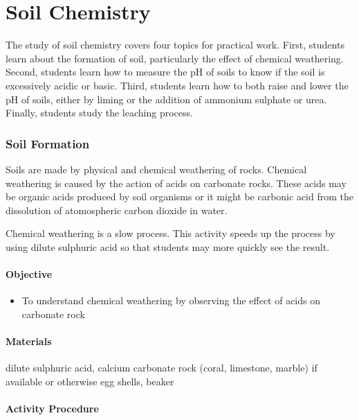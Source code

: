 \chapter{Soil Chemistry}

The study of soil chemistry covers four topics for practical work. First, students learn about the formation of soil, particularly the effect of chemical weathering. Second, students learn how to measure the pH of soils to know if the soil is excessively acidic or basic. Third, students learn how to both raise and lower the pH of soils, either by liming or the addition of ammonium sulphate or urea. Finally, students study the leaching process.

\subsection{Soil Formation}

Soils are made by physical and chemical weathering of rocks. Chemical weathering is caused by the action of acids on carbonate rocks. These acids may be organic acids produced by soil organisms or it might be carbonic acid from the dissolution of atomospheric carbon dioxide in water.

Chemical weathering is a slow process. This activity speeds up the process by using dilute sulphuric acid so that students may more quickly see the result.

\subsubsection{Objective}
\begin{itemize}
\item{To understand chemical weathering by observing the effect of acids on carbonate rock}
\end{itemize}

\subsubsection{Materials}
dilute sulphuric acid, calcium carbonate rock (coral, limestone, marble) if available or otherwise egg shells, beaker

\subsubsection{Activity Procedure}
\begin{enumerate}
\item{Place carbonate rock or egg shells in a beaker.}
\item{Add dilute sulphuric acid.}
\item{Observe effervence.}
\item{
\end{enumerate}

